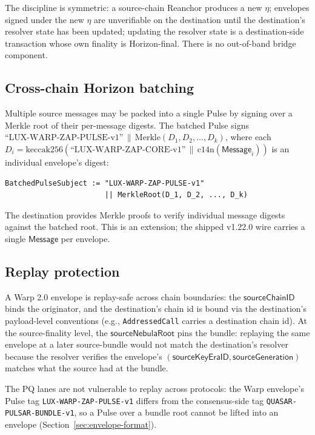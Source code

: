 The discipline is symmetric: a source-chain Reanchor produces a new $\eta$; envelopes signed under the new $\eta$ are unverifiable on the destination until the destination's resolver state has been updated; updating the resolver state is a destination-side transaction whose own finality is Horizon-final. There is no out-of-band bridge component.

\subsection{Cross-chain Horizon batching}

Multiple source messages may be packed into a single Pulse by signing over a Merkle root of their per-message digests. The batched Pulse signs $\text{``LUX-WARP-ZAP-PULSE-v1''} \,\|\, \mathrm{Merkle}(D_1, D_2, \ldots, D_k)$, where each $D_i = \mathrm{keccak256}(\text{``LUX-WARP-ZAP-CORE-v1''}\,\|\,\mathrm{c14n}(\mathsf{Message}_i))$ is an individual envelope's digest:

\begin{verbatim}
BatchedPulseSubject := "LUX-WARP-ZAP-PULSE-v1"
                       || MerkleRoot(D_1, D_2, ..., D_k)
\end{verbatim}

The destination provides Merkle proofs to verify individual message digests against the batched root. This is an extension; the shipped v1.22.0 wire carries a single $\mathsf{Message}$ per envelope.

\subsection{Replay protection}

A Warp 2.0 envelope is replay-safe across chain boundaries: the $\mathsf{sourceChainID}$ binds the originator, and the destination's chain id is bound via the destination's payload-level conventions (e.g., \texttt{AddressedCall} carries a destination chain id). At the source-finality level, the $\mathsf{sourceNebulaRoot}$ pins the bundle: replaying the same envelope at a later source-bundle would not match the destination's resolver because the resolver verifies the envelope's $(\mathsf{sourceKeyEraID}, \mathsf{sourceGeneration})$ matches what the source had at the bundle.

The PQ lanes are not vulnerable to replay across protocols: the Warp envelope's Pulse tag \texttt{LUX-WARP-ZAP-PULSE-v1} differs from the consensus-side tag \texttt{QUASAR-PULSAR-BUNDLE-v1}, so a Pulse over a bundle root cannot be lifted into an envelope (Section~\ref{sec:envelope-format}).
